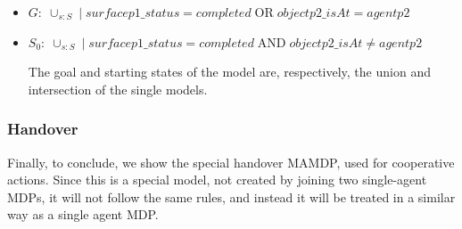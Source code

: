 \begin{itemize}
	\item $G:\; \cup_{s:S}\; |\; surfacep1\_status=completed\; \text{OR} \; objectp2\_isAt=agentp2$
	\item $S_0:\; \cup_{s:S} \; | \; surfacep1\_status=completed \; \text{AND} \; objectp2\_isAt \neq agentp2$

	The goal and starting states of the model are, respectively, the union and intersection of the single models.
\end{itemize}


\subsubsection{Handover}
Finally, to conclude, we show the special handover MAMDP, used for cooperative actions. Since this is a special model, not created by joining two single-agent MDPs, it will not follow the same rules, and instead it will be treated in a similar way as a single agent MDP.

